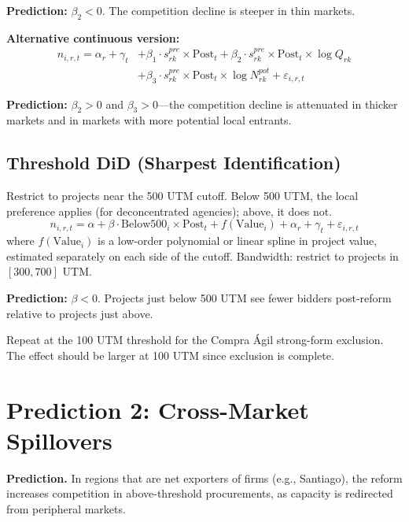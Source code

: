 \documentclass[12pt]{article}
\begin{document}
\textbf{Prediction:} $\beta_2 < 0$. The competition decline is steeper in thin markets.

\medskip
\noindent \textbf{Alternative continuous version:}
\begin{equation}\label{eq:triple_continuous}
\begin{split}
    n_{i,r,t} = \alpha_r + \gamma_t &+ \beta_1 \cdot s_{rk}^{pre} \times \text{Post}_t + \beta_2 \cdot s_{rk}^{pre} \times \text{Post}_t \times \log Q_{rk} \\
    &+ \beta_3 \cdot s_{rk}^{pre} \times \text{Post}_t \times \log N_{rk}^{pot} + \varepsilon_{i,r,t}
\end{split}
\end{equation}

\textbf{Prediction:} $\beta_2 > 0$ and $\beta_3 > 0$---the competition decline is attenuated in thicker markets and in markets with more potential local entrants.

\subsection{Threshold DiD (Sharpest Identification)}

Restrict to projects near the 500 UTM cutoff. Below 500 UTM, the local preference applies (for deconcentrated agencies); above, it does not.
\begin{equation}\label{eq:threshold_did}
    n_{i,r,t} = \alpha + \beta \cdot \text{Below500}_i \times \text{Post}_t + f(\text{Value}_i) + \alpha_r + \gamma_t + \varepsilon_{i,r,t}
\end{equation}
where $f(\text{Value}_i)$ is a low-order polynomial or linear spline in project value, estimated separately on each side of the cutoff. Bandwidth: restrict to projects in $[300, 700]$ UTM.

\textbf{Prediction:} $\beta < 0$. Projects just below 500 UTM see fewer bidders post-reform relative to projects just above.

Repeat at the 100 UTM threshold for the Compra \'{A}gil strong-form exclusion. The effect should be larger at 100 UTM since exclusion is complete.

\section{Prediction 2: Cross-Market Spillovers}

\textbf{Prediction.} In regions that are net exporters of firms (e.g., Santiago), the reform increases competition in above-threshold procurements, as capacity is redirected from peripheral markets.
\end{document}
